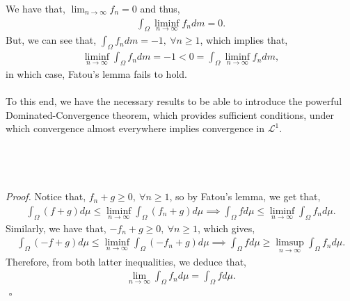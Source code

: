 \documentclass{article}
\begin{document}
We have that, $\lim_{n\to\infty}f_n = 0$ and thus,
\begin{eqnarray}
\nonumber
\int_\Omega \liminf_{n\to\infty}f_n dm = 0.
\end{eqnarray}
But, we can see that, $\int_\Omega f_n dm = -1, \ \forall n \geq 1$, which implies that,
\begin{eqnarray}
\nonumber
\liminf_{n\to\infty} \int_\Omega f_n dm = -1 < 0 = \int_{\Omega} \liminf_{n\to\infty} f_n dm,
\end{eqnarray}
in which case, Fatou's lemma fails to hold.\\\\
To this end, we have the necessary results to be able to introduce the powerful Dominated-Convergence theorem, which provides sufficient conditions, under which convergence almost everywhere implies convergence in $\mathcal{L}^1$. \\\\
\noindent{}\\\\\\
\textit{Proof.} Notice that, $f_n + g \geq 0, \ \forall n\geq1$, so by Fatou's lemma, we get that,
\begin{eqnarray}
\nonumber
\int_\Omega(f+g)d\mu \leq \liminf_{n\to\infty}\int_\Omega (f_n + g) d\mu \implies \int_\Omega f d\mu \leq \liminf_{n\to\infty}\int_\Omega f_n d\mu.
\end{eqnarray}
Similarly, we have that, $-f_n + g \geq 0, \ \forall n\geq1$, which gives,
\begin{eqnarray}
\nonumber
\int_\Omega(-f+g)d\mu \leq \liminf_{n\to\infty}\int_\Omega (-f_n + g) d\mu \implies \int_\Omega f d\mu \geq \limsup_{n\to\infty}\int_\Omega f_n d\mu.
\end{eqnarray}
Therefore, from both latter inequalities, we deduce that,
\begin{eqnarray}
\nonumber
\lim_{n\to\infty}\int_\Omega f_n d\mu = \int_\Omega f d\mu.
\end{eqnarray}
${}$ \hfill $\square$
\newpage
\end{document}
